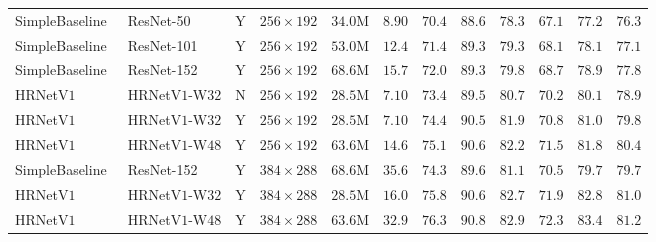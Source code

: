 \documentclass[10pt,journal,compsoc]{IEEEtran}
\begin{document}
\begin{table}[t]
\begin{tabular}{l|l|c|r|r|c|cccccc}
SimpleBaseline~\cite{XiaoWW18} & ResNet-50 & Y & $256\times192$  &$34.0$M &$8.90$
&${70.4}$ & ${88.6}$&${78.3}$&${67.1}$&${77.2}$&${76.3}$\\
SimpleBaseline~\cite{XiaoWW18} & ResNet-101 & Y & $256\times192$  &$53.0$M &$12.4$
&${71.4}$ & ${89.3}$&${79.3}$&${68.1}$&${78.1}$&${77.1}$\\
SimpleBaseline~\cite{XiaoWW18} & ResNet-152  & Y & $256\times192$ &$68.6$M &$15.7$
&${72.0}$ & ${89.3}$&${79.8}$&${68.7}$&${78.9}$&${77.8}$\\
\hline
HRNetV$1$ & HRNetV$1$-W$32$ & N & $256\times 192$&  $28.5$M & $7.10$ &
$73.4$&$89.5$&$80.7$&$70.2$&$80.1$&$78.9$  \\
HRNetV$1$ & HRNetV$1$-W$32$& Y & $256\times 192$&  $28.5$M & $7.10$ &
$74.4$&$90.5$&$81.9$&$70.8$&$81.0$&$79.8$  \\
HRNetV$1$ & HRNetV$1$-W$48$& Y &  $256\times 192$&  $63.6$M &$14.6$ &
$75.1$&$90.6$&$82.2$&$71.5$&$81.8$&$80.4$  \\
\hline
SimpleBaseline~\cite{XiaoWW18} & ResNet-152  & Y &  $384\times288$     &$68.6$M &$35.6$
&${74.3}$ & ${89.6}$&${81.1}$&${70.5}$&${79.7}$&${79.7}$\\
HRNetV$1$ &HRNetV$1$-W$32$ & Y &  $384\times 288$&  $28.5$M &$16.0$ & $75.8$&$90.6$&${82.7}$&$71.9$&$82.8$&$81.0$  \\
HRNetV$1$ & HRNetV$1$-W$48$& Y &  $384\times 288$&  $63.6$M &$32.9$ & $\mathbf{76.3}$&$\mathbf{90.8}$&$\mathbf{82.9}$&$\mathbf{72.3}$&$\mathbf{83.4}$&$\mathbf{81.2}$  \\
\hline
\end{tabular}
\vspace{-1mm}
\end{table}
\end{document}
